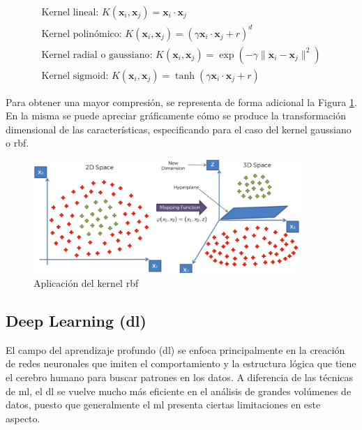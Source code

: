 \begin{equation}
    \begin{aligned}
        \text{Kernel lineal: } K(\mathbf{x}_i, \mathbf{x}_j) = \mathbf{x}_i \cdot \mathbf{x}_j \\
        \text{Kernel polinómico: } K(\mathbf{x}_i, \mathbf{x}_j) = (\gamma \mathbf{x}_i \cdot \mathbf{x}_j + r)^d \\
        \text{Kernel radial o gaussiano: } K(\mathbf{x}_i, \mathbf{x}_j) = \exp \left( -\gamma \| \mathbf{x}_i - \mathbf{x}_j \|^2 \right) \\
        \text{Kernel sigmoid: } K(\mathbf{x}_i, \mathbf{x}_j) = \tanh(\gamma \mathbf{x}_i \cdot \mathbf{x}_j + r)
    \end{aligned}
\end{equation}


\vspace{3mm}

Para obtener una mayor compresión, se representa de forma adicional la Figura \ref{fig:rbf}. En la misma se puede apreciar gráficamente cómo se produce la transformación dimensional de las características, especificando para el caso del kernel gaussiano o \gls{rbf}.

\vspace{3mm}

\begin{figure}[H]
    \centering
    \includegraphics[width=0.9\textwidth]{img/teoria/rbf.png}
    \caption{Aplicación del kernel \acrshort{rbf} \cite{rbf}}
    \label{fig:rbf}
\end{figure}

\subsection{Deep Learning (\acrshort{dl})}
\label{sec:dl}

El campo del aprendizaje profundo (\acrfull{dl}) se enfoca principalmente en la creación de redes neuronales que imiten el comportamiento y la estructura lógica que tiene el cerebro humano para buscar patrones en los datos. A diferencia de las técnicas de \gls{ml}, el \gls{dl} se vuelve mucho más eficiente en el análisis de grandes volúmenes de datos, puesto que generalmente el \gls{ml} presenta ciertas limitaciones \cite{metal} en este aspecto.

